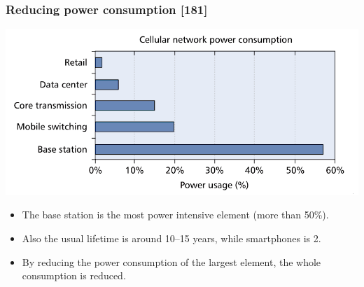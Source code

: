 \documentclass[a4paper,12pt,handout]{beamer}
\begin{document}
\note{}
\begin{frame}
\frametitle{Reducing power consumption [181]}
	\begin{center}
	\includegraphics[scale=1]{consumption.png}
	\end{center}

\begin{itemize}

	\item The base station is the most power intensive element (more than 50\%).
	\item Also the usual lifetime is around 10--15 years, while smartphones is 2.
	\item By reducing the power consumption of the largest element, the whole 
	consumption is reduced.

\end{itemize}
\end{frame}
\note{}
\end{document}
